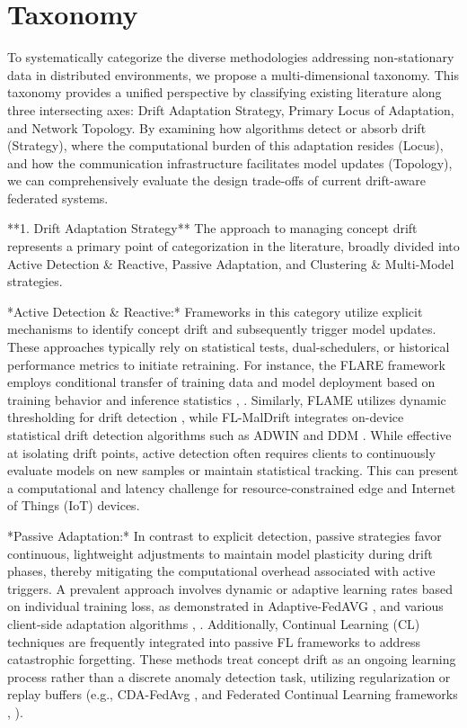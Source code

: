\documentclass[journal]{IEEEtran}
\begin{document}
\section{Taxonomy}
\label{sec:taxonomy}

To systematically categorize the diverse methodologies addressing non-stationary data in distributed environments, we propose a multi-dimensional taxonomy. This taxonomy provides a unified perspective by classifying existing literature along three intersecting axes: Drift Adaptation Strategy, Primary Locus of Adaptation, and Network Topology. By examining how algorithms detect or absorb drift (Strategy), where the computational burden of this adaptation resides (Locus), and how the communication infrastructure facilitates model updates (Topology), we can comprehensively evaluate the design trade-offs of current drift-aware federated systems.

**1. Drift Adaptation Strategy**
The approach to managing concept drift represents a primary point of categorization in the literature, broadly divided into Active Detection \& Reactive, Passive Adaptation, and Clustering \& Multi-Model strategies.

*Active Detection \& Reactive:* Frameworks in this category utilize explicit mechanisms to identify concept drift and subsequently trigger model updates. These approaches typically rely on statistical tests, dual-schedulers, or historical performance metrics to initiate retraining. For instance, the FLARE framework employs conditional transfer of training data and model deployment based on training behavior and inference statistics \cite{Chow2023}, \cite{Chow2023a}. Similarly, FLAME utilizes dynamic thresholding for drift detection \cite{Mavromatis2024}, while FL-MalDrift integrates on-device statistical drift detection algorithms such as ADWIN and DDM \cite{Patel2025}. While effective at isolating drift points, active detection often requires clients to continuously evaluate models on new samples or maintain statistical tracking. This can present a computational and latency challenge for resource-constrained edge and Internet of Things (IoT) devices.

*Passive Adaptation:* In contrast to explicit detection, passive strategies favor continuous, lightweight adjustments to maintain model plasticity during drift phases, thereby mitigating the computational overhead associated with active triggers. A prevalent approach involves dynamic or adaptive learning rates based on individual training loss, as demonstrated in Adaptive-FedAVG \cite{Canonaco2021a}, \cite{Canonaco2021} and various client-side adaptation algorithms \cite{Saile2024a}, \cite{Saile2024}. Additionally, Continual Learning (CL) techniques are frequently integrated into passive FL frameworks to address catastrophic forgetting. These methods treat concept drift as an ongoing learning process rather than a discrete anomaly detection task, utilizing regularization or replay buffers (e.g., CDA-FedAvg \cite{Casado2021a}, \cite{Casado2021} and Federated Continual Learning frameworks \cite{Hamedi2025}, \cite{Benameur2025}).
\end{document}
